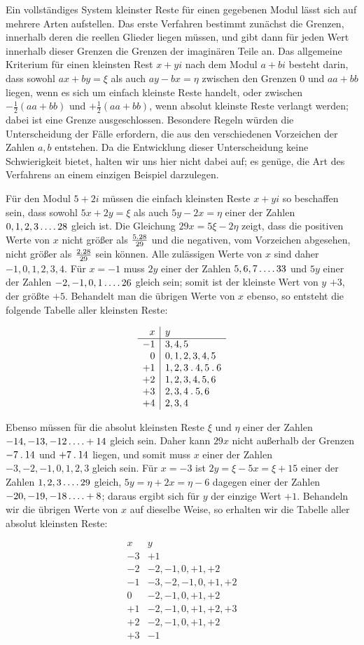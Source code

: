 Ein vollständiges System kleinster Reste für einen gegebenen Modul lässt sich auf mehrere Arten aufstellen. Das erste Verfahren bestimmt zunächst die Grenzen, innerhalb deren die reellen Glieder liegen müssen, und gibt dann für jeden Wert innerhalb dieser Grenzen die Grenzen der imaginären Teile an. Das allgemeine Kriterium für einen kleinsten Rest $x+yi$ nach dem Modul $a+bi$ besteht darin, dass sowohl $ax+by=\xi$ als auch $ay-bx=\eta$ zwischen den Grenzen $0$ und $aa+bb$ liegen, wenn es sich um einfach kleinste Reste handelt, oder zwischen $-\frac12(aa+bb)$ und $+\frac12(aa+bb)$, wenn absolut kleinste Reste verlangt werden; dabei ist eine Grenze ausgeschlossen. Besondere Regeln würden die Unterscheidung der Fälle erfordern, die aus den verschiedenen Vorzeichen der Zahlen $a,b$ entstehen. Da die Entwicklung dieser Unterscheidung keine Schwierigkeit bietet, halten wir uns hier nicht dabei auf; es genüge, die Art des Verfahrens an einem einzigen Beispiel darzulegen.

Für den Modul $5+2i$ müssen die einfach kleinsten Reste $x+yi$ so beschaffen sein, dass sowohl $5x+2y=\xi$ als auch $5y-2x=\eta$ einer der Zahlen $0,1,2,3\mathinner{.\,.\,.\,.}28$ gleich ist. Die Gleichung $29x=5\xi-2\eta$ zeigt, dass die positiven Werte von $x$ nicht größer als $\frac{5\mathbin{.}28}{29}$ und die negativen, vom Vorzeichen abgesehen, nicht größer als $\frac{2\mathbin{.}28}{29}$ sein können. Alle zulässigen Werte von $x$ sind daher $-1,0,1,2,3,4$. Für $x=-1$ muss $2y$ einer der Zahlen $5,6,7\mathinner{.\,.\,.\,.}33$ und $5y$ einer der Zahlen $-2,-1,0,1\mathinner{.\,.\,.\,.}26$ gleich sein; somit ist der kleinste Wert von $y$ $+3$, der größte $+5$. Behandelt man die übrigen Werte von $x$ ebenso, so entsteht die folgende Tabelle aller kleinsten Reste:

%
\[
\begin{array}{r|l}
x&y\\\hline
-1&3,4,5\\
0&0,1,2,3,4,5\\
+1&1,2,3\mathbin{.}4,5\mathbin{.}6\\
+2&1,2,3,4,5,6\\
+3&2,3,4\mathbin{.}5,6\\
+4&2,3,4
\end{array}
\]

Ebenso müssen für die absolut kleinsten Reste $\xi$ und $\eta$ einer der Zahlen $-14,-13,-12\mathinner{.\,.\,.\,.}+14$ gleich sein. Daher kann $29x$ nicht außerhalb der Grenzen $-7\mathbin{.}14$ und $+7\mathbin{.}14$ liegen, und somit muss $x$ einer der Zahlen $-3,-2,-1,0,1,2,3$ gleich sein. Für $x=-3$ ist $2y=\xi-5x=\xi+15$ einer der Zahlen $1,2,3\mathinner{.\,.\,.\,.}29$ gleich, $5y=\eta+2x=\eta-6$ dagegen einer der Zahlen $-20,-19,-18\mathinner{.\,.\,.\,.}+8$; daraus ergibt sich für $y$ der einzige Wert $+1$. Behandeln wir die übrigen Werte von $x$ auf dieselbe Weise, so erhalten wir die Tabelle aller absolut kleinsten Reste:

\[
\begin{array}{r|l}
x&y\\\hline
-3&+1\\
-2&-2,-1,0,+1,+2\\
-1&-3,-2,-1,0,+1,+2\\
0&-2,-1,0,+1,+2\\
+1&-2,-1,0,+1,+2,+3\\
+2&-2,-1,0,+1,+2\\
+3&-1
\end{array}
\]

